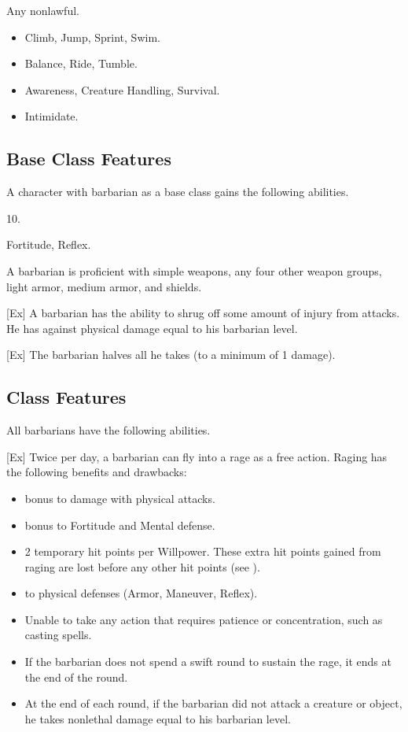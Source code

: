  Any nonlawful.

\begin{itemize}
    \item {} Climb, Jump, Sprint, Swim.
    \item {} Balance, Ride, Tumble.
    \item {} Awareness, Creature Handling, Survival.
    \item {} Intimidate.
\end{itemize}

\subsection{Base Class Features}
A character with barbarian as a base class gains the following abilities.

 10.

  Fortitude,  Reflex.

A barbarian is proficient with simple weapons, any four other weapon groups, light armor, medium armor, and shields.

[Ex]
A barbarian has the ability to shrug off some amount of injury from attacks.
He has  against physical damage equal to his barbarian level.

[Ex]
The barbarian halves all  he takes (to a minimum of 1 damage).

\subsection{Class Features}
All barbarians have the following abilities.

[Ex]
Twice per day, a barbarian can fly into a rage as a free action.
Raging has the following benefits and drawbacks:
\begin{itemize}
    \item {} bonus to damage with physical attacks.
    \item {} bonus to Fortitude and Mental defense.
    \item 2 temporary hit points per Willpower.
        These extra hit points gained from raging are lost before any other hit points (see ).
    \item {} to physical defenses (Armor, Maneuver, Reflex).
    \item Unable to take any action that requires patience or concentration, such as casting spells.
    \item If the barbarian does not spend a swift round to sustain the rage, it ends at the end of the round.
    \item At the end of each round, if the barbarian did not attack a creature or object, he takes nonlethal damage equal to his barbarian level.
\end{itemize}

